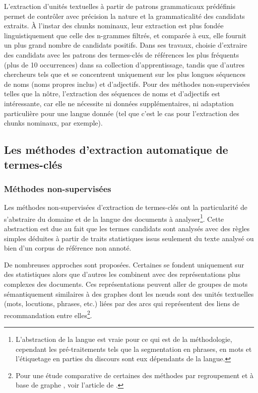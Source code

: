       L'extraction d'unités textuelles à partir de patrons grammaticaux
      prédéfinis permet de contrôler avec précision la nature et la
      grammaticalité des candidats extraits. À l'instar des chunks nominaux,
      leur extraction est plus fondée linguistiquement que celle des n-grammes
      filtrés, et comparée à eux, elle fournit un plus grand nombre de candidats
      positifs. Dans ses travaux, \citet{hulth2003keywordextraction} choisie
      d'extraire des candidats avec les patrons des termes-clés de références
      les plus fréquents (plus de 10 occurrences) dans sa collection
      d'apprentissage, tandis que d'autres chercheurs tels que
      \citet{wan2008expandrank} et \citet{hassan2010conundrums} se
      concentrent uniquement sur les plus longues séquences de noms (noms
      propres inclus) et d'adjectifs. Pour des méthodes non-supervisées telles
      que la nôtre, l'extraction des séquences de  noms et d'adjectifs est
      intéressante, car elle ne nécessite ni données supplémentaires, ni
      adaptation particulière pour une langue donnée (tel que c'est le cas pour
      l'extraction des chunks nominaux, par exemple).

    \subsection{Les méthodes d'extraction automatique de termes-clés}
    \label{sec:methods}

      \subsubsection{Méthodes non-supervisées}
      \label{sec:unsupervised_methods}
        Les méthodes non-supervisées d'extraction de termes-clés ont la
        particularité de s'abstraire du domaine et de la langue des documents à
        analyser\footnote{L'abstraction de la langue est vraie pour ce qui est de la
        méthodologie, cependant les pré-traitements tels que la segmentation en
        phrases, en mots et l'étiquetage en parties du discours sont eux dépendants
        de la langue.}. Cette abstraction est due au fait que les termes candidats
        sont analysés avec des règles simples déduites à partir de traits
        statistiques issus seulement du texte analysé ou bien d'un corpus de
        référence non annoté.

        De nombreuses approches sont proposées. Certaines se fondent uniquement sur
        des statistiques alors que d'autres les combinent avec des représentations
        plus complexes des documents. Ces représentations peuvent aller de groupes
        de mots sémantiquement similaires à des graphes dont les n\oe{}uds sont des
        unités textuelles (mots, locutions, phrases, etc.) liées par des arcs qui
        représentent des liens de recommandation entre elles\footnote{Pour une étude
        comparative de certaines des méthodes par regroupement
        \citep{liu2009keycluster} et à base de graphe \citep{mihalcea2004textrank,
        wan2008expandrank}, voir l'article de \citet{hassan2010conundrums}.}.

